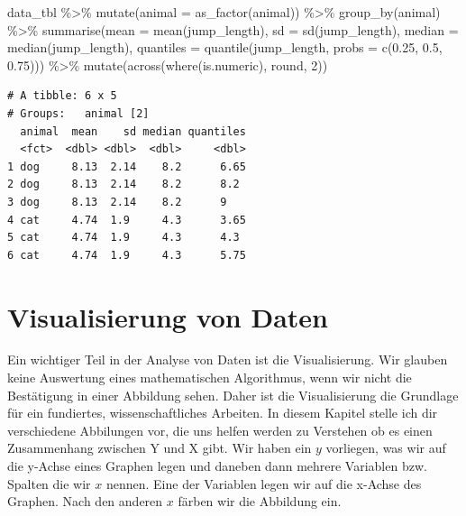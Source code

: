 \documentclass[
  letterpaper,
  DIV=11,
  oneside]{scrreport}
\newenvironment{Shaded}{\begin{snugshade}}{\end{snugshade}}
\newcommand{\AttributeTok}[1]{\textcolor[rgb]{0.40,0.45,0.13}{#1}}
\newcommand{\DecValTok}[1]{\textcolor[rgb]{0.68,0.00,0.00}{#1}}
\newcommand{\FloatTok}[1]{\textcolor[rgb]{0.68,0.00,0.00}{#1}}
\newcommand{\FunctionTok}[1]{\textcolor[rgb]{0.28,0.35,0.67}{#1}}
\newcommand{\NormalTok}[1]{\textcolor[rgb]{0.00,0.23,0.31}{#1}}
\newcommand{\SpecialCharTok}[1]{\textcolor[rgb]{0.37,0.37,0.37}{#1}}
\begin{document}
\begin{Shaded}
\begin{Highlighting}[]
\NormalTok{data\_tbl }\SpecialCharTok{\%\textgreater{}\%}
  \FunctionTok{mutate}\NormalTok{(}\AttributeTok{animal =} \FunctionTok{as\_factor}\NormalTok{(animal)) }\SpecialCharTok{\%\textgreater{}\%}
  \FunctionTok{group\_by}\NormalTok{(animal) }\SpecialCharTok{\%\textgreater{}\%}
  \FunctionTok{summarise}\NormalTok{(}\AttributeTok{mean =} \FunctionTok{mean}\NormalTok{(jump\_length),}
            \AttributeTok{sd =} \FunctionTok{sd}\NormalTok{(jump\_length),}
            \AttributeTok{median =} \FunctionTok{median}\NormalTok{(jump\_length),}
            \AttributeTok{quantiles =} \FunctionTok{quantile}\NormalTok{(jump\_length, }
                                 \AttributeTok{probs =} \FunctionTok{c}\NormalTok{(}\FloatTok{0.25}\NormalTok{, }\FloatTok{0.5}\NormalTok{, }\FloatTok{0.75}\NormalTok{))) }\SpecialCharTok{\%\textgreater{}\%} 
  \FunctionTok{mutate}\NormalTok{(}\FunctionTok{across}\NormalTok{(}\FunctionTok{where}\NormalTok{(is.numeric), round, }\DecValTok{2}\NormalTok{))}
\end{Highlighting}
\end{Shaded}

\begin{verbatim}
# A tibble: 6 x 5
# Groups:   animal [2]
  animal  mean    sd median quantiles
  <fct>  <dbl> <dbl>  <dbl>     <dbl>
1 dog     8.13  2.14    8.2      6.65
2 dog     8.13  2.14    8.2      8.2 
3 dog     8.13  2.14    8.2      9   
4 cat     4.74  1.9     4.3      3.65
5 cat     4.74  1.9     4.3      4.3 
6 cat     4.74  1.9     4.3      5.75
\end{verbatim}

\hypertarget{sec-eda-ggplot}{%
\chapter{Visualisierung von Daten}\label{sec-eda-ggplot}}

{}

Ein wichtiger Teil in der Analyse von Daten ist die Visualisierung. Wir
glauben keine Auswertung eines mathematischen Algorithmus, wenn wir
nicht die Bestätigung in einer Abbildung sehen. Daher ist die
Visualisierung die Grundlage für ein fundiertes, wissenschaftliches
Arbeiten. In diesem Kapitel stelle ich dir verschiedene Abbilungen vor,
die uns helfen werden zu Verstehen ob es einen Zusammenhang zwischen Y
und X gibt. Wir haben ein \(y\) vorliegen, was wir auf die y-Achse eines
Graphen legen und daneben dann mehrere Variablen bzw. Spalten die wir
\(x\) nennen. Eine der Variablen legen wir auf die x-Achse des Graphen.
Nach den anderen \(x\) färben wir die Abbildung ein.
\end{document}
